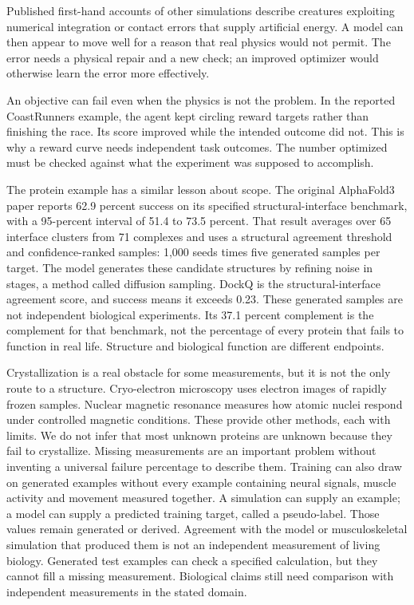 Published first-hand accounts of other simulations describe creatures exploiting
numerical integration or contact errors that supply artificial energy. A model
can then appear to move well for a reason that real physics would not permit.
The error needs a physical repair and a new check; an improved optimizer would
otherwise learn the error more effectively.\cite{surprises2018}

An objective can fail even when the physics is not the problem. In the reported
CoastRunners example, the agent kept circling reward targets rather than finishing
the race. Its score improved while the intended outcome did not.\cite{specgaming2020}
This is why a reward curve needs independent task outcomes. The number optimized
must be checked against what the experiment was supposed to accomplish.

The protein example has a similar lesson about scope. The original AlphaFold3
paper reports 62.9 percent success on its specified structural-interface benchmark,
with a 95-percent interval of 51.4 to 73.5 percent. That result averages over
65 interface clusters from 71 complexes and uses a structural agreement threshold
and confidence-ranked samples: 1,000 seeds times five generated samples per
target. The model generates these candidate structures by refining noise in
stages, a method called diffusion sampling. DockQ is the structural-interface agreement score, and success means
it exceeds 0.23. These generated samples are not independent biological
experiments. Its 37.1 percent complement is the complement
for that benchmark, not the percentage of every protein that fails to function
in real life. Structure and biological function are different endpoints.\cite{alphafold32024}

Crystallization is a real obstacle for some measurements, but it is not the
only route to a structure. Cryo-electron microscopy uses electron images of rapidly frozen samples. Nuclear magnetic resonance measures how atomic nuclei respond under controlled magnetic conditions. These provide other methods, each with limits. We do not infer that most
unknown proteins are unknown because they fail to crystallize.\cite{pdbmethods}
Missing measurements are an important problem without inventing a universal
failure percentage to describe them.
Training can also draw on generated examples without every example containing neural signals, muscle activity and movement measured together. A simulation can supply an example; a model can supply a predicted training target, called a pseudo-label. Those values remain generated or derived. Agreement with the model or musculoskeletal simulation that produced them is not an independent measurement of living biology. Generated test examples can check a specified calculation, but they cannot fill a missing measurement. Biological claims still need comparison with independent measurements in the stated domain.

